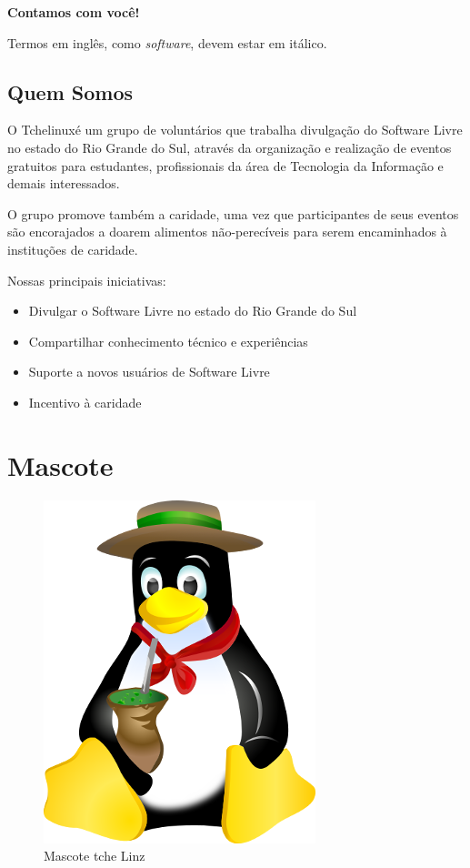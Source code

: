 \documentclass{book}
\newcommand{\tl}{Tchelinux}
\begin{document}
	\textbf{Contamos com você! }
	
	Termos em inglês, como \textit{software}, devem estar em itálico.	
	
	
	\subsection{Quem Somos}
	\label{quem}
	O \tl é um grupo de voluntários que trabalha divulgação do Software Livre no estado do Rio Grande do Sul, através da organização e realização de eventos gratuitos para estudantes, profissionais da área de Tecnologia da Informação e demais interessados.
	
	O grupo promove também a caridade, uma vez que participantes de seus eventos são encorajados a doarem alimentos não-perecíveis para serem encaminhados à instituções de caridade.
	
	Nossas principais iniciativas:
	\begin{itemize}
		\item Divulgar o Software Livre no estado do Rio Grande do Sul
		\item Compartilhar conhecimento técnico e experiências
		\item Suporte a novos usuários de Software Livre
		\item Incentivo à caridade
	\end{itemize}
	
	
	\section{Mascote}
	\label{mascote}
	
	\begin{figure}[!htb]
		\centering
		\includegraphics{figura.png}
		\caption{Mascote tche Linz}
		\label{figura_tux}
	\end{figure}
	
\end{document}
